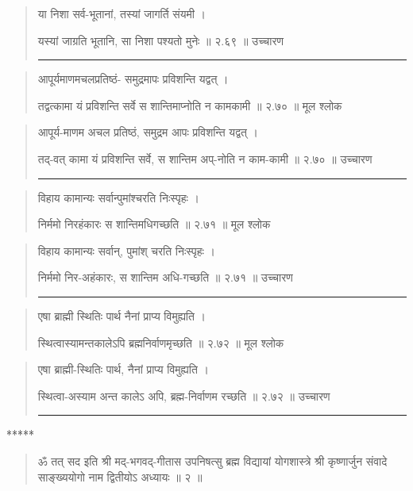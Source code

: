 \begin{quotation}

या निशा सर्व-भूतानां, तस्यां जागर्ति संयमी  ।  

यस्यां जाग्रति भूतानि, सा निशा पश्यतो मुनेः  ॥ २.६९ ॥  उच्चारण

\noindent\rule{16cm}{0.4pt} 
\end{quotation}


\begin{quotation}
आपूर्यमाणमचलप्रतिष्ठं-
समुद्रमापः प्रविशन्ति यद्वत्‌  ।  

तद्वत्कामा यं प्रविशन्ति सर्वे
स शान्तिमाप्नोति न कामकामी  ॥ २.७० ॥  मूल श्लोक
\end{quotation}

\begin{quotation}

आपूर्य-माणम अचल प्रतिष्ठं, 
समुद्रम आपः प्रविशन्ति यद्वत्‌  ।  

तद्-वत् कामा यं प्रविशन्ति सर्वे, 
स शान्तिम अप्-नोति न काम-कामी  ॥ २.७० ॥  उच्चारण

\noindent\rule{16cm}{0.4pt} 
\end{quotation}


\begin{quotation}

विहाय कामान्यः सर्वान्पुमांश्चरति निःस्पृहः  ।  

निर्ममो निरहंकारः स शान्तिमधिगच्छति  ॥ २.७१ ॥  मूल श्लोक
\end{quotation}

\begin{quotation}

विहाय कामान्यः सर्वान्, पुमांश् चरति निःस्पृहः  ।  

निर्ममो निर-अहंकारः, स शान्तिम अधि-गच्छति  ॥ २.७१ ॥  उच्चारण

\noindent\rule{16cm}{0.4pt} 
\end{quotation}


\begin{quotation}

एषा ब्राह्मी स्थितिः पार्थ नैनां प्राप्य विमुह्यति  ।  

स्थित्वास्यामन्तकालेऽपि ब्रह्मनिर्वाणमृच्छति  ॥ २.७२ ॥  मूल श्लोक
\end{quotation}

\begin{quotation}

एषा ब्राह्मी-स्थितिः पार्थ, नैनां प्राप्य विमुह्यति  ।  

स्थित्वा-अस्याम अन्त कालेऽ अपि, ब्रह्म-निर्वाणम रच्छति  ॥ २.७२ ॥  उच्चारण

\noindent\rule{16cm}{0.4pt} 
\end{quotation}

\begin{center}  ***** \end{center}

\begin{quotation}
ॐ तत् सद इति श्री मद्-भगवद्-गीतास उपनिषत्सु ब्रह्म विद्यायां योगशास्त्रे श्री कृष्णार्जुन संवादे साङ्ख्ययोगो नाम द्वितीयोऽ अध्यायः  ॥  २  ॥ 
\end{quotation}

